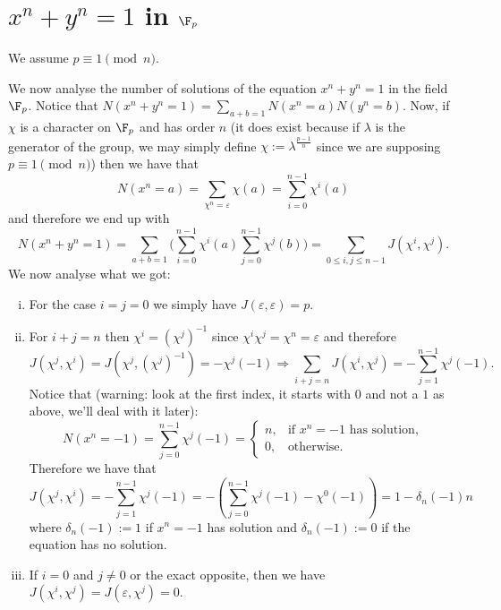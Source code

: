 \section{\texorpdfstring{\(x^n + y^n = 1\)}{xn + yn = 1} in
  \texorpdfstring{\(\F_p\) }{F_p}}

\begin{remark}
    We assume \(p \equiv 1 \pmod{n}\).
\end{remark}

We now analyse the number of solutions of the equation \(x^n + y^n = 1\) in the
field \(\F_p\). Notice that  \(N(x^n + y^n = 1) = \sum_{a + b = 1} N(x^n =
a)N(y^n = b)\). Now, if \(\chi\) is a character on \(\F_p\) and has order
\(n\) (it does exist because if \(\lambda\) is the generator of the group, we
may simply define \(\chi := \lambda^{\frac{p-1}{n}}\) since we are supposing
\(p\equiv 1 \pmod{n}\)) then we have that
\[
    N(x^n = a) = \sum_{\chi^n = \varepsilon} \chi(a) = \sum_{i = 0}^{n-1}
    \chi^i(a)
\]
and therefore we end up with
\[
    N(x^n + y^n = 1) = \sum_{a+b=1} \bigg(\sum_{i = 0}^{n-1} \chi^i(a) \sum_{j =
        0}^{n-1} \chi^j(b)\bigg)
    = \sum_{0 \leqslant i, j \leqslant n-1 } J(\chi^i, \chi^j).
\]
We now analyse what we got:
\begin{enumerate}[i.]
    \item For the case \(i = j = 0\) we simply have \(J(\varepsilon, \varepsilon)
          = p\).
    \item For \(i + j = n\) then  \(\chi^i = (\chi^j)^{-1}\) since \(\chi^i
          \chi^j = \chi^n = \varepsilon\) and therefore
          \[
              J(\chi^j, \chi^i) = J(\chi^j, (\chi^j)^{-1}) = - \chi^j(-1) \Rightarrow
              \sum_{i+j = n} J(\chi^i, \chi^j) = - \sum_{j = 1}^{n-1} \chi^j(-1).
          \]
          Notice that (warning: look at the first index, it starts with \(0\) and
          not a \(1\) as above, we'll deal with it later):
          \[
              N(x^n = -1) = \sum_{j=0}^{n-1} \chi^j(-1) =
              \begin{cases}
                  n, & \text{if } x^n = -1  \text{ has solution}, \\
                  0, & \text{otherwise}.
              \end{cases}
          \]
          Therefore we have that
          \[
              J(\chi^j, \chi^i) = -\sum_{j=1}^{n-1} \chi^j(-1)
              = - \left( \sum_{j=0}^{n-1} \chi^j(-1) - \chi^0(-1) \right)
              = 1 - \delta_n(-1)n
          \]
          where \(\delta_n(-1) := 1\) if  \(x^n = -1\) has solution and
          \(\delta_n(-1) := 0\) if the equation has no solution.
    \item If \(i = 0\) and \(j \neq 0\) or the exact opposite, then we have
          \(J(\chi^i, \chi^j) = J(\varepsilon, \chi^j) = 0\).
\end{enumerate}

